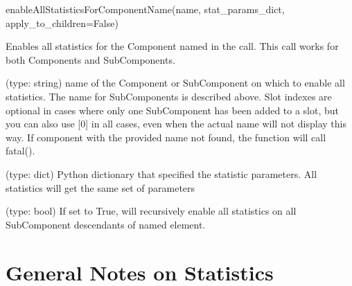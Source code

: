 \begin{functiondoc}{enableAllStatisticsForComponentName(name, stat_params_dict,
    apply_to_children=False)}{

    Enables all statistics for the Component named in the call.  This
    call works for both Components and SubComponents.
}

   (type: string) name of the Component or SubComponent on
  which to enable all statistics.  The name for SubComponents is
  described above.  Slot indexes are optional in cases where only one
  SubComponent has been added to a slot, but you can also use [0] in
  all cases, even when the actual name will not display this way.  If
  component with the provided name not found, the function will call
  fatal().

   (type: dict) Python dictionary that
  specified the statistic parameters.  All statistics will get the
  same set of parameters

   (type: bool) If set to True, will
  recursively enable all statistics on all SubComponent descendants of
  named element.

  \noreturn
\end{functiondoc}


\section{General Notes on Statistics}
\label{sec:gen-notes-stats}


